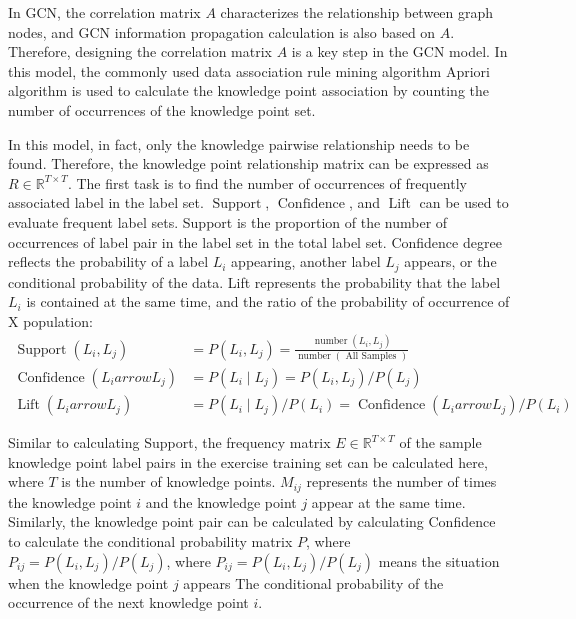In GCN, the correlation matrix \(A\) characterizes the relationship between graph nodes, and GCN information propagation calculation is also based on \(A\). Therefore, designing the correlation matrix \(A\) is a key step in the GCN model. In this model, the commonly used data association rule mining algorithm Apriori algorithm is used to calculate the knowledge point association by counting the number of occurrences of the knowledge point set.

In this model, in fact, only the knowledge pairwise relationship needs to be found. Therefore, the knowledge point relationship matrix can be expressed as \(R\in \mathbb{R}^{T\times T}\). The first task is to find the number of occurrences of frequently associated label in the label set. \(\operatorname{Support}\), \(\operatorname{Confidence}\), and \(\operatorname{Lift}\) can be used to evaluate frequent label sets. Support is the proportion of the number of occurrences of label pair in the label set in the total label set. Confidence degree reflects the probability of a label \(L_i\) appearing, another label \(L_j\) appears, or the conditional probability of the data. Lift represents the probability that the label \(L_i\) is contained at the same time, and the ratio of the probability of occurrence of X population:
\begin{align}
	\operatorname{Support}(L_i, L_j)         & =P(L_i,L_j)=\frac{\operatorname{number}(L_i,L_j)}{\operatorname{number}(\text{ All Samples })} \\
	\operatorname{Confidence}(L_i arrow L_j) & =P(L_i \mid L_j)=P(L_i, L_j) / P(L_j)                                                          \\
	\operatorname{Lift}(L_i arrow L_j)       & =P(L_i \mid L_j) / P(L_i)=\operatorname{Confidence}(L_i arrow L_j) / P(L_i)
\end{align}

Similar to calculating Support, the frequency matrix \(E\in \mathbb{R}^{T\times T}\) of the sample knowledge point label pairs in the exercise training set can be calculated here, where \(T\) is the number of knowledge points. \(M_{ij}\) represents the number of times the knowledge point \(i\) and the knowledge point \(j\) appear at the same time. Similarly, the knowledge point pair can be calculated by calculating Confidence to calculate the conditional probability matrix \(P\), where \(P_{ij}=P(L_i, L_j)/P(L_j)\), where \(P_{ij}=P(L_i, L_j)/P(L_j)\) means the situation when the knowledge point \(j\) appears The conditional probability of the occurrence of the next knowledge point \(i\).

